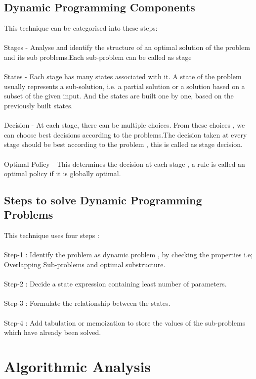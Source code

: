 \documentclass[conference]{IEEEtran}
\begin{document}
\subsection{Dynamic Programming Components}
This technique can be categorised into these steps:\\\\
Stages - Analyse and identify the structure of an optimal solution of the problem and its sub problems.Each sub-problem can be called as stage\\\\
States - Each stage has many states associated with it. A state of the problem usually represents a sub-solution, i.e. a partial solution or a solution based on a subset of the given input. And the states are built one by one, based on the previously built states.\\\\
Decision - At each stage, there can be multiple choices. From these choices , we can choose best decisions according to the problems.The decision taken at every stage should be best according to the problem , this is called as stage decision.\\\\
Optimal Policy -  This determines the decision at each stage , a rule is called an optimal policy if it is globally optimal.

\subsection{Steps to solve Dynamic Programming Problems}
This technique uses four steps :\\\\
Step-1 : Identify the problem as dynamic problem , by checking the properties i.e; Overlapping Sub-problems and optimal substructure.\\\\
Step-2 : Decide a state expression containing least number of parameters.\\\\
Step-3 : Formulate the relationship between the states.\\\\
Step-4 : Add tabulation or memoization to store the values of the sub-problems which have already been solved.

\section{Algorithmic Analysis}
\end{document}
